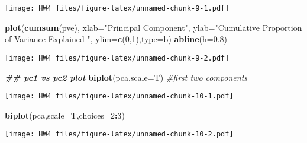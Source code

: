 \documentclass[
]{article}
\newenvironment{Shaded}{\begin{snugshade}}{\end{snugshade}}
\newcommand{\AttributeTok}[1]{\textcolor[rgb]{0.13,0.29,0.53}{#1}}
\newcommand{\CommentTok}[1]{\textcolor[rgb]{0.56,0.35,0.01}{\textit{#1}}}
\newcommand{\DecValTok}[1]{\textcolor[rgb]{0.00,0.00,0.81}{#1}}
\newcommand{\DocumentationTok}[1]{\textcolor[rgb]{0.56,0.35,0.01}{\textbf{\textit{#1}}}}
\newcommand{\FloatTok}[1]{\textcolor[rgb]{0.00,0.00,0.81}{#1}}
\newcommand{\FunctionTok}[1]{\textcolor[rgb]{0.13,0.29,0.53}{\textbf{#1}}}
\newcommand{\NormalTok}[1]{#1}
\newcommand{\OtherTok}[1]{\textcolor[rgb]{0.56,0.35,0.01}{#1}}
\newcommand{\SpecialCharTok}[1]{\textcolor[rgb]{0.81,0.36,0.00}{\textbf{#1}}}
\newcommand{\StringTok}[1]{\textcolor[rgb]{0.31,0.60,0.02}{#1}}
\begin{document}
\begin{Shaded}
\end{Shaded}

\texttt{[image: HW4\_files/figure-latex/unnamed-chunk-9-1.pdf]}

\begin{Shaded}
\begin{Highlighting}[]
\FunctionTok{plot}\NormalTok{(}\FunctionTok{cumsum}\NormalTok{(pve), }\AttributeTok{xlab=}\StringTok{"Principal Component"}\NormalTok{, }\AttributeTok{ylab=}\StringTok{"Cumulative Proportion of Variance Explained "}\NormalTok{, }\AttributeTok{ylim=}\FunctionTok{c}\NormalTok{(}\DecValTok{0}\NormalTok{,}\DecValTok{1}\NormalTok{),}\AttributeTok{type=}\StringTok{\textquotesingle{}b\textquotesingle{}}\NormalTok{)}
\FunctionTok{abline}\NormalTok{(}\AttributeTok{h=}\FloatTok{0.8}\NormalTok{)}
\end{Highlighting}
\end{Shaded}

\texttt{[image: HW4\_files/figure-latex/unnamed-chunk-9-2.pdf]}

\begin{Shaded}
\begin{Highlighting}[]
\DocumentationTok{\#\# pc1 vs pc2 plot}
\FunctionTok{biplot}\NormalTok{(pca,}\AttributeTok{scale=}\NormalTok{T) }\CommentTok{\#first two components}
\end{Highlighting}
\end{Shaded}

\texttt{[image: HW4\_files/figure-latex/unnamed-chunk-10-1.pdf]}

\begin{Shaded}
\begin{Highlighting}[]
\FunctionTok{biplot}\NormalTok{(pca,}\AttributeTok{scale=}\NormalTok{T,}\AttributeTok{choices=}\DecValTok{2}\SpecialCharTok{:}\DecValTok{3}\NormalTok{)}
\end{Highlighting}
\end{Shaded}

\texttt{[image: HW4\_files/figure-latex/unnamed-chunk-10-2.pdf]}
\end{document}
